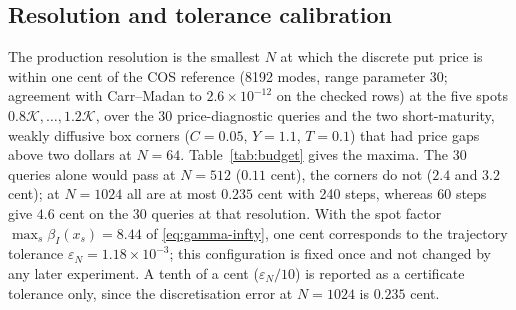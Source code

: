 \documentclass[hidelinks]{siamart251216}
\begin{document}
\subsection{Resolution and tolerance calibration}
\label{ssec:calibration}
The production resolution is the smallest $N$ at which the discrete put price is within one cent
of the COS reference \cite{FangOosterlee2008} (8192 modes, range parameter 30; agreement with
Carr--Madan to $2.6\times10^{-12}$ on the checked rows) at the five spots $0.8\mathcal K,\dots,1.2\mathcal K$, over the
30 price-diagnostic queries and the two short-maturity, weakly diffusive box corners
($C=0.05$, $Y=1.1$, $T=0.1$) that had price gaps above two dollars at $N=64$.
Table~\ref{tab:budget} gives the maxima.  The 30 queries alone would pass at $N=512$ ($0.11$ cent),
the corners do not ($2.4$ and $3.2$ cent); at $N=1024$ all are at most $0.235$ cent with 240 steps,
whereas 60 steps give $4.6$ cent on the 30 queries at that resolution.  With the spot factor
$\max_s\beta_I(x_s)=8.44$ of \eqref{eq:gamma-infty}, one cent corresponds to the trajectory
tolerance $\varepsilon_N=1.18\times10^{-3}$; this configuration is fixed once and not changed by
any later experiment.  A tenth of a cent ($\varepsilon_N/10$) is reported as a certificate
tolerance only, since the discretisation error at $N=1024$ is $0.235$ cent.

\end{document}
